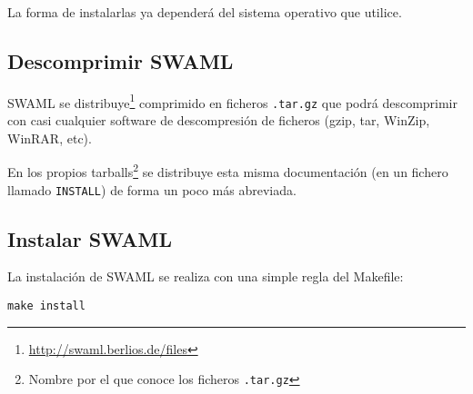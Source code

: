 La forma de instalarlas ya dependerá del sistema operativo que utilice.


\subsection*{Descomprimir SWAML}

SWAML se distribuye\footnote{\url{http://swaml.berlios.de/files}} comprimido
en ficheros \texttt{.tar.gz}  que podrá descomprimir con casi cualquier 
software de descompresión de ficheros (gzip, tar, WinZip, WinRAR, etc).

En los propios tarballs\footnote{Nombre por el que conoce los ficheros \texttt{.tar.gz}}
se distribuye esta misma documentación (en un fichero llamado \texttt{INSTALL})
de forma un poco más abreviada.

\subsection*{Instalar SWAML}

La instalación de SWAML se realiza con una simple regla del Makefile:

\begin{center}
	\texttt{make install}
\end{center}
